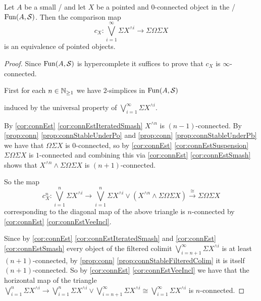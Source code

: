 \begin{prop}\label{prop:jamesSplittingPresheaf} %
    Let $A$ be a small \inftycat/ and let $X$ be a pointed and $0$-connected object in the \inftytop/ $\operatorname{Fun}(A,\mathcal{S})$.
    Then the comparison map 
    \begin{equation*}
        c_X\colon\bigvee\limits_{i=1}^{\infty}\Sigma X^{\wedge i}\to\Sigma\Omega\Sigma X
    \end{equation*}
    is an equivalence of pointed objects. 
    \begin{proof}
        Since $\operatorname{Fun}(A,\mathcal{S})$ is hypercomplete it suffices to prove that $c_X$ is $\infty$-connected.

        First for each $n\in\mathbb{N}_{\geq 1}$ we have $2$-simplices in $\operatorname{Fun}(A,\mathcal{S})$
        \begin{center}
        \end{center}
        induced by the universal property of $\bigvee\limits_{i=1}^{\infty}\Sigma X^{\wedge i}$.

        By \cref{cor:connEst} \ref{cor:connEstIteratedSmash} $X^{\wedge n}$ is $(n-1)$-connected.
        By \cref{prop:conn} \ref{prop:connStableUnderPo} and \cref{prop:conn} \ref{prop:connStableUnderPb} we have that $\Omega\Sigma X$ is $0$-connected, so by \cref{cor:connEst} \ref{cor:connEstSuspension} $\Sigma\Omega\Sigma X$ is $1$-connected and combining this via \cref{cor:connEst} \ref{cor:connEstSmash} shows that $X^{\wedge n}\wedge\Sigma\Omega\Sigma X$ is $(n+1)$-connected.

        So the map 
        \begin{equation*}
            c_X^n\colon\bigvee\limits_{i=1}^n\Sigma X^{\wedge i}\to\bigvee\limits_{i=1}^n\Sigma X^{\wedge i}\vee\left(X^{\wedge n}\wedge\Sigma\Omega\Sigma X\right)\xrightarrow{\cong}\Sigma\Omega\Sigma X
        \end{equation*}
        corresponding to the diagonal map of the above triangle is $n$-connected by \cref{cor:connEst} \ref{cor:connEstVeeIncl}.

        Since by \cref{cor:connEst} \ref{cor:connEstIteratedSmash} and \cref{cor:connEst} \ref{cor:connEstSmash} every object of the filtered colimit $\bigvee\limits_{i=n+1}^{\infty}\Sigma X^{\wedge i}$ is at least $(n+1)$-connected, by \cref{prop:conn} \ref{prop:connStableFilteredColim} it is itself $(n+1)$-connected.
        So by \cref{cor:connEst} \ref{cor:connEstVeeIncl} we have that the horizontal map of the triangle $\bigvee\limits_{i=1}^n\Sigma X^{\wedge i}\to\bigvee\limits_{i=1}^n\Sigma X^{\wedge i}\vee\bigvee\limits_{i=n+1}^{\infty}\Sigma X^{\wedge i}\cong\bigvee\limits_{i=1}^{\infty}\Sigma X^{\wedge i}$ is $n$-connected.


\end{proof}
\end{prop}

